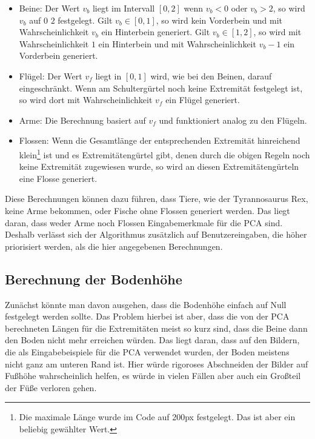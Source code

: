 \begin{itemize}
 \item Beine: Der Wert $v_b$ liegt im Intervall $[0, 2]$ \bzw wenn $v_b < 0$ oder $v_b > 2$, so wird $v_b$ auf $0$ \bzw $2$ festgelegt. Gilt $v_b \in [0, 1]$, so wird kein Vorderbein und mit Wahrscheinlichkeit $v_b$ ein Hinterbein generiert. Gilt $v_b \in [1, 2]$, so wird mit Wahrscheinlichkeit $1$ ein Hinterbein und mit Wahrscheinlichkeit $v_b - 1$ ein Vorderbein generiert.
 
 \item Flügel: Der Wert $v_f$ liegt in $[0, 1]$ \bzw wird, wie bei den Beinen, darauf eingeschränkt. Wenn am Schultergürtel noch keine Extremität festgelegt ist, so wird dort mit Wahrscheinlichkeit $v_f$ ein Flügel generiert.
 
 \item Arme: Die Berechnung basiert auf $v_f$ und funktioniert analog zu den Flügeln.
 
 \item Flossen: Wenn die Gesamtlänge der entsprechenden Extremität hinreichend klein\footnote{Die maximale Länge wurde im Code auf 200px festgelegt. Das ist aber ein beliebig gewählter Wert.} ist und es Extremitätengürtel gibt, denen durch die obigen Regeln noch keine Extremität zugewiesen wurde, so wird an diesen Extremitätengürteln eine Flosse generiert.
\end{itemize}

Diese Berechnungen können dazu führen, dass Tiere, wie der Tyrannosaurus Rex, keine Arme bekommen, oder Fische ohne Flossen generiert werden. Das liegt daran, dass weder Arme noch Flossen Eingabemerkmale für die PCA sind. Deshalb verlässt sich der Algorithmus zusätzlich auf Benutzereingaben, die höher priorisiert werden, als die hier angegebenen Berechnungen.

\subsection{Berechnung der Bodenhöhe}
\label{floor_height}

Zunächst könnte man davon ausgehen, dass die Bodenhöhe einfach auf Null festgelegt werden sollte. Das Problem hierbei ist aber, dass die von der PCA berechneten Längen für die Extremitäten meist so kurz sind, dass die Beine dann den Boden nicht mehr erreichen würden. Das liegt daran, dass auf den Bildern, die als Eingabebeispiele für die PCA verwendet wurden, der Boden meistens nicht ganz am unteren Rand ist. Hier würde rigoroses Abschneiden der Bilder auf Fußhöhe wahrscheinlich helfen, es würde in vielen Fällen aber auch ein Großteil der Füße verloren gehen.


